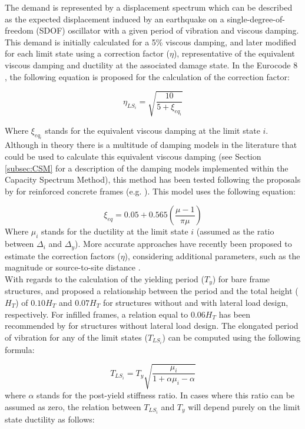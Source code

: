 The demand is represented by a displacement spectrum which can be described as the expected displacement induced by an earthquake on a single-degree-of-freedom (SDOF) oscillator with a given period of vibration and viscous damping. This demand is initially calculated for a 5\% viscous damping, and later modified for each limit state using a correction factor ($\eta$), representative of the equivalent viscous damping and ductility at the associated damage state. In the Eurocode 8 \citep{CEN2005}, the following equation is proposed for the calculation of the correction factor:

\begin{equation}
\eta_{LS_i} = \sqrt{\frac{10}{5+\xi_{eq_i}}}
\end{equation}

Where $\xi_{eq_i}$ stands for the equivalent viscous damping at the limit state $i$. Although in theory there is a multitude of damping models in the literature that could be used to calculate this equivalent viscous damping (see Section \ref{subsec:CSM} for a description of the damping models implemented within the Capacity Spectrum Method), this method has been tested following the proposals by \cite{PriestleyEtAl2007} for reinforced concrete frames (e.g. \cite{BalEtAl2010} \cite{SilvaEtAl2013}). This model uses the following equation:

\begin{equation}
\xi_{eq} = 0.05 + 0.565\left(\frac{\mu-1}{\pi\mu}\right)
\end{equation}
Where $\mu_i$ stands for the ductility at the limit state $i$ (assumed as the ratio between $\Delta_i$ and $\Delta_y$). More accurate approaches have recently been proposed to estimate the correction factors ($\eta$), considering additional parameters, such as the magnitude or source-to-site distance \citep{RezaeianEtAl2012}.\\

With regards to the calculation of the yielding period ($T_y$) for bare frame structures, \cite{CrowleyPinho2004} and \cite{CrowleyEtAl2008} proposed a relationship between the period and the total height ($H_T$) of $0.10H_T$ and $0.07H_T$ for structures without and with lateral load design, respectively. For infilled frames, a relation equal to $0.06H_T$ has been recommended by \cite{CrowleyPinho2006} for structures without lateral load design. The elongated period of vibration for any of the limit states ($T_{LS_i}$) can be computed using the following formula:

\begin{equation}
T_{LS_i} = T_y\sqrt{\frac{\mu_{i}}{1+\alpha\mu_{i}-\alpha}}
\end{equation}
where $\alpha$ stands for the post-yield stiffness ratio. In cases where this ratio can be assumed as zero, the relation between $T_{LS_i}$ and $T_y$ will depend purely on the limit state ductility as follows:


